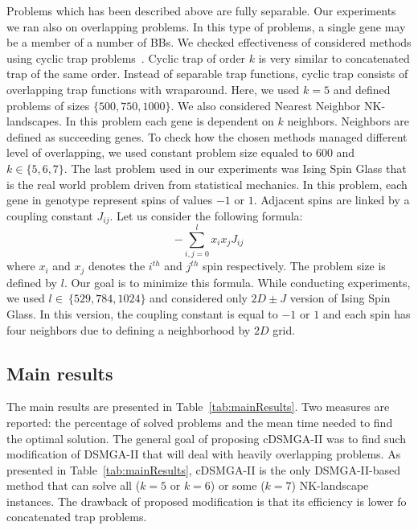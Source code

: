 Problems which has been described above are fully separable. Our experiments we ran also on overlapping problems. In this type of problems, a single gene may be a member of a number of BBs. We checked effectiveness of considered methods using cyclic trap problems~\cite{cyclicTrap}. Cyclic trap of order $k$ is very similar to concatenated trap of the same order. Instead of separable trap functions, cyclic trap consists of overlapping trap functions with wraparound. Here, we used $k = 5$ and defined problems of sizes $\{500, 750, 1000\}$. We also considered Nearest Neighbor NK-landscapes. In this problem each gene is dependent on $k$ neighbors. Neighbors are defined as succeeding genes. To check how the chosen methods managed different level of overlapping, we used constant problem size equaled to $600$ and $k \in \{5, 6, 7\}$. The last problem used in our experiments was Ising Spin Glass that is the real world problem driven from statistical mechanics. In this problem, each gene in genotype represent spins of values $-1$ or $1$. Adjacent spins are linked by a coupling constant $J_{ij}$. Let us consider the following formula:
\begin{equation}
	- \sum_{i,j=0}^{l} x_i x_j J_{ij}
\end{equation}
where $x_i$ and $x_j$ denotes the $i^{th}$ and $j^{th}$ spin respectively. The problem size is defined by $l$. Our goal is to minimize this formula. While conducting experiments, we used $l \in\ \{529, 784, 1024\}$ and considered only $2D \pm J$ version of Ising Spin Glass. In this version, the coupling constant is equal to $-1$ or $1$ and each spin has four neighbors due to defining a neighborhood by $2D$ grid.

\subsection{Main results}

The main results are presented in Table~\ref{tab:mainResults}. Two measures are reported: the percentage of solved problems and the mean time needed to find the optimal solution. The general goal of proposing cDSMGA-II was to find such modification of DSMGA-II that will deal with heavily overlapping problems. As presented in Table~\ref{tab:mainResults}, cDSMGA-II is the only DSMGA-II-based method that can solve all ($k = 5$ or $k = 6$) or some ($k = 7$) NK-landscape instances. The drawback of proposed modification is that its efficiency is lower fo concatenated trap problems. 

